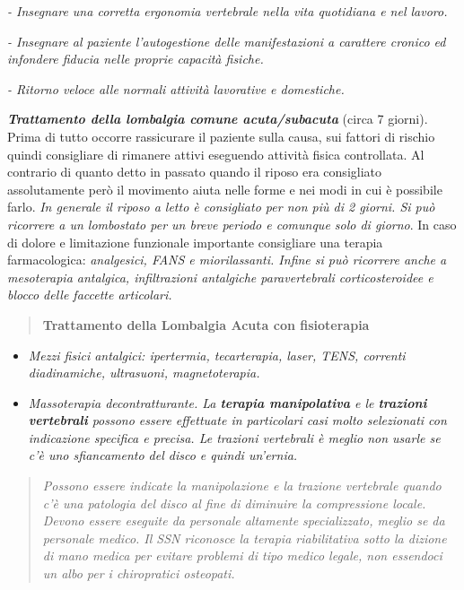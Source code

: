 \documentclass[]{article}
\begin{document}
\emph{- Insegnare una corretta ergonomia vertebrale nella vita
quotidiana e nel lavoro. }

\emph{- Insegnare al paziente l'autogestione delle manifestazioni a
carattere cronico ed infondere fiducia nelle proprie capacità fisiche. }

\emph{- Ritorno veloce alle normali attività lavorative e domestiche. }

\textbf{\emph{Trattamento della lombalgia comune acuta/subacuta}} (circa
7 giorni). Prima di tutto occorre rassicurare il paziente sulla causa,
sui fattori di rischio quindi consigliare di rimanere attivi eseguendo
attività fisica controllata. Al contrario di quanto detto in passato
quando il riposo era consigliato assolutamente però il movimento aiuta
nelle forme e nei modi in cui è possibile farlo. \emph{In generale il
riposo a letto è consigliato per non più di 2 giorni. Si può ricorrere a
un lombostato per un breve periodo e comunque solo di giorno}. In caso
di dolore e limitazione funzionale importante consigliare una terapia
farmacologica: \emph{analgesici, FANS e miorilassanti. Infine si può
ricorrere anche a mesoterapia antalgica, infiltrazioni antalgiche
paravertebrali corticosteroidee e blocco delle faccette articolari.}

\begin{quote}
\textbf{Trattamento della Lombalgia Acuta con fisioterapia }
\end{quote}

\begin{itemize}
\item
  \emph{Mezzi fisici antalgici: ipertermia, tecarterapia, laser, TENS,
  correnti diadinamiche, ultrasuoni, magnetoterapia.}
\item
  \emph{Massoterapia decontratturante. La \textbf{terapia manipolativa}
  e le \textbf{trazioni vertebrali} possono essere effettuate in
  particolari casi molto selezionati con indicazione specifica e
  precisa. Le trazioni vertebrali è meglio non usarle se c'è uno
  sfiancamento del disco e quindi un'ernia.}
\end{itemize}

\begin{quote}
\emph{Possono essere indicate la manipolazione e la trazione vertebrale
quando c'è una patologia del disco al fine di diminuire la compressione
locale. Devono essere eseguite da personale altamente specializzato,
meglio se da personale medico. Il SSN riconosce la terapia riabilitativa
sotto la dizione di mano medica per evitare problemi di tipo medico
legale, non essendoci un albo per i chiropratici osteopati. }
\end{quote}
\end{document}
